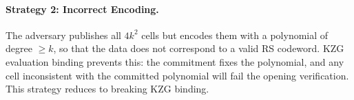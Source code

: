 \paragraph{Strategy 2: Incorrect Encoding.}
The adversary publishes all $4k^2$ cells but encodes them with a polynomial of degree $\geq k$,
so that the data does not correspond to a valid RS codeword. KZG evaluation binding prevents
this: the commitment fixes the polynomial, and any cell inconsistent with the committed
polynomial will fail the opening verification. This strategy reduces to breaking KZG binding.


